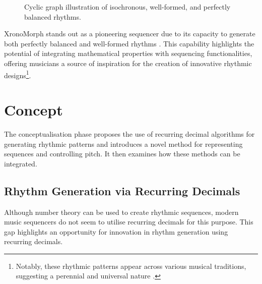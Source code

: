 \documentclass[12pt]{article}
\numberwithin{subsubsubsection}{subsubsection}
\begin{document}
\begin{figure}[ht]
    \centering
    \caption{Cyclic graph illustration of isochronous, well-formed, and perfectly balanced rhythms.}
    \label{fig:PB}
\end{figure}


XronoMorph stands out as a pioneering sequencer due to its capacity to generate both perfectly balanced and well-formed rhythms \cite{Milne}. This capability highlights the potential of integrating mathematical properties with sequencing functionalities, offering musicians a source of inspiration for the creation of innovative rhythmic designs\footnote{Notably, these rhythmic patterns appear across various musical traditions, suggesting a perennial and universal nature \cite{Toussaint1}.}.
\newpage

\section{Concept}

The conceptualisation phase proposes the use of recurring decimal algorithms for generating rhythmic patterns and introduces a novel method for representing sequences and controlling pitch. It then examines how these methods can be integrated.

\subsection{Rhythm Generation via Recurring Decimals}
\label{appendix:recurringdecimals}
Although number theory can be used to create rhythmic sequences, modern music sequencers do not seem to utilise recurring decimals for this purpose. This gap highlights an opportunity for innovation in rhythm generation using recurring decimals.
\end{document}
